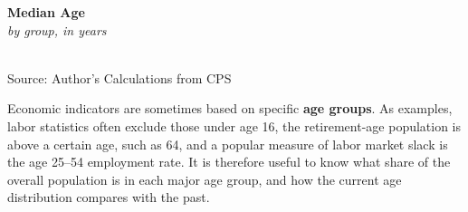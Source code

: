 \documentclass{report}
\makeatletter
\newcommand{\tbllink}[1]{\href{https://raw.githubusercontent.com/bdecon/US-chartbook/master/chartbook/data/#1}{\faTable}}
\newcommand*\short[1]{\expandafter\@gobbletwo\number\numexpr#1\relax}
\newcommand{\absnode}[3]{\node[below right, align=left] at (axis cs: #1,#2) {#3};}
\newcommand{\shdateaxisticks}{
		date coordinates in=x, axis line style={draw=none},
		xmax={2022-03-15},
		max space between ticks=40,	    
		xtick={{1990-01-01}, {1995-01-01}, {2000-01-01}, 
			{2005-01-01}, {2010-01-01}, {2015-01-01}, {2020-01-01}},
		minor xtick={},
		enlarge y limits={0.06}, enlarge x limits={0.01},
		}
\newcommand{\bbar}[2]{extra #1 ticks = {{#2}}, extra #1 tick labels = ,
		extra #1 tick style = {grid=major, grid style={thick, black!25}},}
\newcommand{\stdline}[4]{\addplot[very thick, no markers, color=#1] 
		table [x=#2, y=#3, col sep=comma] {#4};	}
\newcommand{\rbars}{
		\fill[color=black!10] (axis cs:{1990-07-01},\pgfkeysvalueof{/pgfplots/ymin}) rectangle 
			(axis cs:{1991-03-01}, \pgfkeysvalueof{/pgfplots/ymax});
		\fill[color=black!10] (axis cs:{2007-12-01},\pgfkeysvalueof{/pgfplots/ymin}) rectangle 
			(axis cs:{2009-07-01}, \pgfkeysvalueof{/pgfplots/ymax});
		\fill[color=black!10] (axis cs:{2001-03-01},\pgfkeysvalueof{/pgfplots/ymin}) rectangle 
			(axis cs:{2001-11-01}, \pgfkeysvalueof{/pgfplots/ymax});
		\fill[color=black!10] (axis cs:{2020-02-01},\pgfkeysvalueof{/pgfplots/ymin}) rectangle 
			(axis cs:{2020-05-01}, \pgfkeysvalueof{/pgfplots/ymax});}
\makeatother
\begin{document}
{\begin{minipage}{0.76\textwidth}
\begin{minipage}{0.41\textwidth}
\small 
\end{minipage}\hfill
\begin{minipage}{0.53\textwidth}
\normalsize \textbf{Median Age}\\
\footnotesize{\textit{by group, in years}}\\
\noindent \hspace*{-2mm} \\
\footnotesize{Source: Author's Calculations from CPS} \hfill \tbllink{median_age.csv}
\end{minipage}
\vspace{3mm}

\small Economic indicators are sometimes based on specific \textbf{age groups}. As examples, labor statistics often exclude those under age 16, the retirement-age population is above a certain age, such as 64, and a popular measure of labor market slack is the age 25--54 employment rate. It is therefore useful to know what share of the overall population is in each major age group, and how the current age distribution compares with the past. 
\end{minipage}
\vspace{0.5mm}

}
\end{document}
